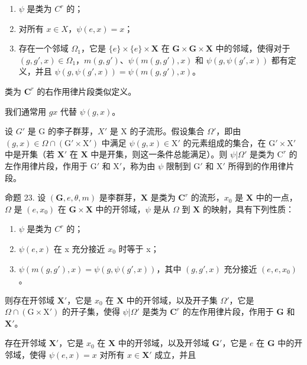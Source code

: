 \begin{enumerate}
\def\labelenumi{(\roman{enumi})}
\item
  \(\psi\) 是类为 \(C^{r}\) 的；
\item
  对所有 \(x \in X\)，\(\psi(e, x) = x\)；
\item
  存在一个邻域 \(\Omega_1\)，它是 \(\{e\} \times \{e\} \times \mathbf{X}\) 在 \(\mathbf{G} \times \mathbf{G} \times \mathbf{X}\) 中的邻域，使得对于 \((g, g', x) \in \Omega_1\)，\(m(g, g')\)、\(\psi(m(g, g'), x)\) 和 \(\psi(g, \psi(g', x))\) 都有定义，并且 \(\psi(g, \psi(g', x)) = \psi(m(g, g'), x)\)。
\end{enumerate}

类为 \(\mathbf{C}^r\) 的右作用律片段类似定义。

我们通常用 \(gx\) 代替 \(\psi(g, x)\)。

设 \(G'\) 是 G 的李子群芽，\(X'\) 是 X 的子流形。假设集合 \(\Omega'\)，即由 \((g,x)\in \Omega \cap (\mathrm{G}'\times \mathrm{X}')\) 中满足 \(\psi (g,x)\in \mathrm{X}'\) 的元素组成的集合，在 \(\mathrm{G}'\times \mathrm{X}'\) 中是开集（若 \(\mathbf{X}'\) 在 \(\mathbf{X}\) 中是开集，则这一条件总能满足）。则 \(\psi |\Omega '\) 是类为 \(\mathrm{C}^r\) 的左作用律片段，作用于 \(\mathrm{G}'\) 和 \(\mathrm{X}'\)，称为由 \(\psi\) 限制到 \(\mathrm{G}'\) 和 \(\mathrm{X}'\) 所得到的作用律片段。

命题 23. 设 \((\mathbf{G}, e, \theta, m)\) 是李群芽，\(\mathbf{X}\) 是类为 \(\mathbf{C}^r\) 的流形，\(x_0\) 是 \(\mathbf{X}\) 中的一点，\(\Omega\) 是 \((e, x_0)\) 在 \(\mathbf{G} \times \mathbf{X}\) 中的开邻域，\(\psi\) 是从 \(\Omega\) 到 \(\mathbf{X}\) 的映射，具有下列性质：

\begin{enumerate}
\def\labelenumi{(\roman{enumi})}
\item
  \(\psi\) 是类为 \(C^{r}\) 的；
\item
  \(\psi(e, x)\) 在 x 充分接近 \(x_{0}\) 时等于 x；
\item
  \(\psi(m(g, g'), x) = \psi(g, \psi(g', x))\)，其中 \((g, g', x)\) 充分接近 \((e, e, x_0)\)。
\end{enumerate}

则存在开邻域 \(\mathbf{X}'\)，它是 \(x_0\) 在 \(\mathbf{X}\) 中的开邻域，以及开子集 \(\Omega'\)，它是 \(\Omega \cap (\mathrm{G} \times \mathrm{X}')\) 的开子集，使得 \(\psi|\Omega'\) 是类为 \(\mathbf{C}^r\) 的左作用律片段，作用于 \(\mathbf{G}\) 和 \(\mathbf{X}'\)。

存在开邻域 \(\mathbf{X}'\)，它是 \(x_0\) 在 \(\mathbf{X}\) 中的开邻域，以及开邻域 \(\mathbf{G}'\)，它是 \(e\) 在 \(\mathbf{G}\) 中的开邻域，使得 \(\psi(e, x) = x\) 对所有 \(x \in \mathbf{X}'\) 成立，并且

